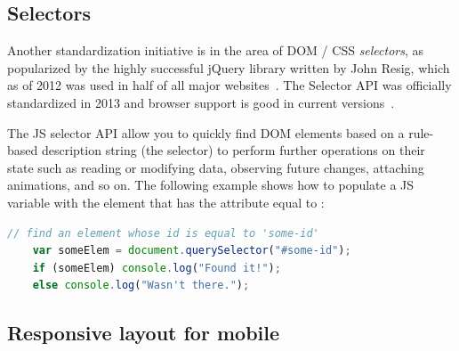 \subsection{Selectors}
\label{sec:bgselectors}
Another standardization initiative is in the area of DOM / CSS \textit{selectors},
as popularized by the highly successful jQuery library
written by John Resig, 
which as of 2012 was used in half of all major websites~\cite{matthiasgelbmann2012}.
The Selector API was officially standardized in 2013 and browser support is good in current versions~\cite{w3ccontributors2013}.

The JS selector API allow you to quickly find DOM elements based on a rule-based description string (the selector) to perform further operations on their state such as reading or modifying data, observing future changes, attaching animations, and so on. 
The following example shows how to populate a JS variable with the element that has the  attribute equal to :

\begin{lstlisting}[language=JavaScript,caption={JavaScript query selector example.}]
	// find an element whose id is equal to 'some-id'
	var someElem = document.querySelector("#some-id");
	if (someElem) console.log("Found it!");
	else console.log("Wasn't there.");
\end{lstlisting}










\subsection{Responsive layout for mobile}

